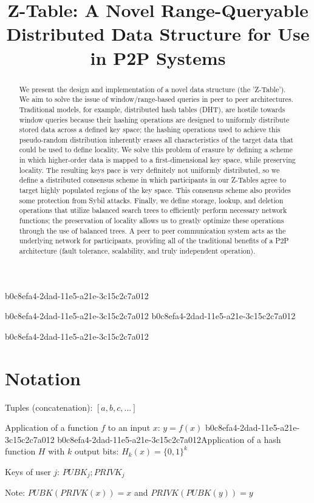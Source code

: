 \documentclass[12pt]{article}
\title{Z-Table: A Novel Range-Queryable Distributed Data Structure for Use in P2P Systems}
\begin{document}
b0c8efa4-2dad-11e5-a21e-3c15c2c7a012
\maketitle
b0c8efa4-2dad-11e5-a21e-3c15c2c7a012
b0c8efa4-2dad-11e5-a21e-3c15c2c7a012\begin{abstract}
We present the design and implementation of a novel data structure (the 'Z-Table'). We aim to solve the issue of window/range-based queries in peer to peer architectures. Traditional models, for example,  distributed hash tables (DHT), are hostile towards window queries because their hashing operations are designed to uniformly distribute stored data across a defined key space; the hashing operations used to achieve this pseudo-random distribution inherently erases all characteristics of the target data that could be used to define locality. We solve this problem of erasure by defining a scheme in which higher-order data is mapped to a first-dimensional key space, while preserving locality. The resulting keys pace is very definitely not uniformly distributed, so we define a distributed consensus scheme in which participants in our Z-Tables agree to target highly populated regions of the key space. This consensus scheme also provides some protection from Sybil attacks. Finally, we define storage, lookup, and deletion operations that utilize balanced search trees to efficiently perform necessary network functions; the preservation of locality allows us to greatly optimize these operations through the use of balanced trees. A peer to peer communication system acts as the underlying network for participants, providing all of the traditional benefits of a P2P architecture (fault tolerance, scalability, and truly independent operation).
\end{abstract}
b0c8efa4-2dad-11e5-a21e-3c15c2c7a012
\section{Notation}

Tuples (concatenation): $[a,b,c,...]$

Application of a function $f$ to an input $x$: $y=f(x)$
b0c8efa4-2dad-11e5-a21e-3c15c2c7a012
b0c8efa4-2dad-11e5-a21e-3c15c2c7a012Application of a hash function $H$ with $k$ output bits: $H_{k}(x) = \{0,1\}^k$

Keys of user $j$: $ PUBK_j; PRIVK_j $

Note: $PUBK(PRIVK(x)) = x$ and $PRIVK(PUBK(y)) = y$~
\end{document}
